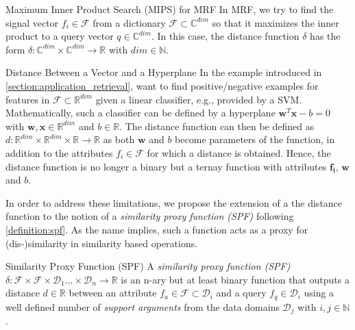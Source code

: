\begin{example}[label=example:mrf]{Maximum Inner Product Search (MIPS) for MRF}{}
In MRF, we try to find the signal vector $f_i \in \mathcal{F}$ from a dictionary $\mathcal{F} \subset \mathbb{C}^{dim}$ so that it maximizes the inner product to a query vector $q \in \mathbb{C}^{dim}$. In this case, the distance function $\delta$ has the form $\delta \colon \mathbb{C}^{dim} \times \mathbb{C}^{dim} \to \mathbb{R}$ with $dim \in \mathbb{N}$.
\end{example}

\begin{example}[label=example:svmdistance]{Distance Between a Vector and a Hyperplane}{}
In the example introduced in \cref{section:application_retrieval}, want to find positive/negative examples for features in $\mathcal{F} \subset \mathbb{R}^{dim}$ given a linear classifier, e.g., provided by a SVM. Mathematically, such a classifier can be defined by a hyperplane $\mathbf{w}^T\mathbf{x} - b = 0$ with $\mathbf{w},\mathbf{x} \in \mathbb{R}^{dim}$ and $b \in \mathbb{R}$. The distance function can then be defined as $d \colon \mathbb{R}^{dim} \times \mathbb{R}^{dim} \times \mathbb{R} \to \mathbb{R}$ as both $\mathbf{w}$ and $b$ become parameters of the function, in addition to the attributes $f_i \in \mathcal{F}$ for which a distance is obtained. Hence, the distance function is no longer a binary but a ternay function with attributes $\mathbf{f_{i}}$, $\mathbf{w}$ and $b$.
\end{example}

In order to address these limitations, we propose the extension of a the distance function to the notion of a \emph{similarity proxy function (SPF)} following \cref{definition:spf}. As the name implies, such a function acts as a proxy for (dis-)similarity in similarity based operations.

\begin{definition}[label=definition:spf]{Similarity Proxy Function (SPF)}{}
    A \emph{similarity proxy function (SPF)} $\delta \colon \mathcal{F} \times \mathcal{F} \times \mathcal{D}_{1} ... \times \mathcal{D}_{n} \to \mathbb{R}$ is an n-ary but at least binary function that outputs a distance $d \in \mathbb{R}$ between an attribute $f_{a} \in \mathcal{F} \subset \mathcal{D}_i$ and a query $f_{q} \in \mathcal{D}_i$ using a well defined number of \emph{support arguments} from the data domains $\mathcal{D}_{j}$ with $i,j \in \mathbb{N}$.
\end{definition}


